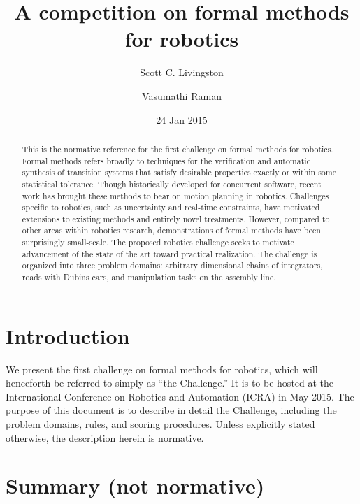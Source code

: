 \documentclass{amsart}
\theoremstyle{definition}
\begin{document}
\title{A competition on formal methods for robotics}
\author{Scott C. Livingston}
\author{Vasumathi Raman}
\date{24 Jan 2015}
\begin{abstract}
This is the normative reference for the first challenge on formal methods for
robotics.  Formal methods refers broadly to techniques for the verification and
automatic synthesis of transition systems that satisfy desirable properties
exactly or within some statistical tolerance.  Though historically developed for
concurrent software, recent work has brought these methods to bear on motion
planning in robotics.  Challenges specific to robotics, such as uncertainty and
real-time constraints, have motivated extensions to existing methods and
entirely novel treatments.  However, compared to other areas within robotics
research, demonstrations of formal methods have been surprisingly small-scale.
The proposed robotics challenge seeks to motivate advancement of the state of
the art toward practical realization.  The challenge is organized into three
problem domains: arbitrary dimensional chains of integrators, roads with Dubins
cars, and manipulation tasks on the assembly line.
\end{abstract}
\maketitle


\section{Introduction}

We present the first challenge on formal methods for robotics, which will
henceforth be referred to simply as ``the Challenge.''  It is to be hosted at
the International Conference on Robotics and Automation ({ICRA}) in May 2015.
The purpose of this document is to describe in detail the Challenge, including
the problem domains, rules, and scoring procedures.  Unless explicitly stated
otherwise, the description herein is normative.

\section{Summary (not normative)}
\end{document}
